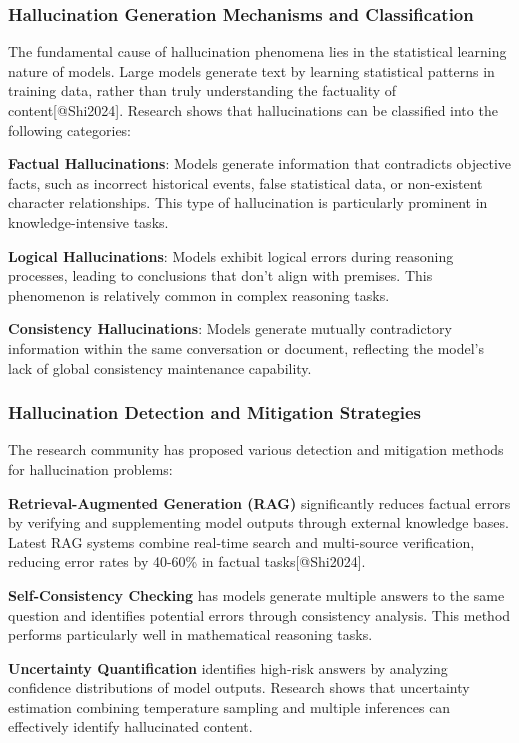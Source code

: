 \documentclass{article}
\begin{document}
\subsubsection{Hallucination Generation Mechanisms and Classification}
The fundamental cause of hallucination phenomena lies in the statistical learning nature of models. Large models generate text by learning statistical patterns in training data, rather than truly understanding the factuality of content[@Shi2024]. Research shows that hallucinations can be classified into the following categories:

\textbf{Factual Hallucinations}: Models generate information that contradicts objective facts, such as incorrect historical events, false statistical data, or non-existent character relationships. This type of hallucination is particularly prominent in knowledge-intensive tasks.

\textbf{Logical Hallucinations}: Models exhibit logical errors during reasoning processes, leading to conclusions that don't align with premises. This phenomenon is relatively common in complex reasoning tasks.

\textbf{Consistency Hallucinations}: Models generate mutually contradictory information within the same conversation or document, reflecting the model's lack of global consistency maintenance capability.

\subsubsection{Hallucination Detection and Mitigation Strategies}
The research community has proposed various detection and mitigation methods for hallucination problems:

\textbf{Retrieval-Augmented Generation (RAG)} significantly reduces factual errors by verifying and supplementing model outputs through external knowledge bases. Latest RAG systems combine real-time search and multi-source verification, reducing error rates by 40-60\% in factual tasks[@Shi2024].

\textbf{Self-Consistency Checking} has models generate multiple answers to the same question and identifies potential errors through consistency analysis. This method performs particularly well in mathematical reasoning tasks.

\textbf{Uncertainty Quantification} identifies high-risk answers by analyzing confidence distributions of model outputs. Research shows that uncertainty estimation combining temperature sampling and multiple inferences can effectively identify hallucinated content.
\end{document}
